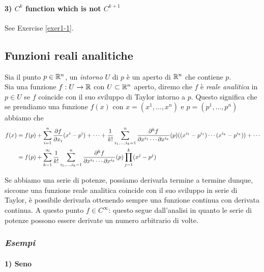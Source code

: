 \paragraph{3) $ C^{k} $ function which is not $ C^{k+1} $}

See Exercise \ref{exer1-1}.

\subsection{Funzioni reali analitiche}

Sia il punto $ p \in \mathbb{R}^{n} $, un \textit{intorno} $ U $ di $ p $ è un aperto di $ \mathbb{R}^{n} $ che contiene $ p $. \\
Sia una funzione $ f : U \to \mathbb{R} $ con $ U \subset \mathbb{R}^{n} $ aperto, diremo che $ f $ è \textit{reale analitica} in $ p \in U $ se $ f $ coincide con il suo sviluppo di Taylor intorno a $ p $. Questo significa che se prendiamo una funzione $ f (x) $ con $ x = (x^{1}, \dots, x^{n}) $ e $ p = (p^{1}, \dots, p^{n}) $ abbiamo che
\begin{align}
	\begin{split}
		f (x) &= f (p) + \sum_{i=1}^{n} \pdv{f}{x_{i}} (p) (x^{i} - p^{i}) + \cdots + \dfrac{1}{k!} \sum_{i_{1},\dots,i_{k}=1}^{n} \dfrac{\partial^{k} f}{\partial x^{i_{1}} \cdots \partial x^{i_{k}}} (p) ( (x^{i_{1}} - p^{i_{1}}) \cdots (x^{i_{k}} - p^{i_{k}}) ) + \cdots \\
		&= f (p) + \sum_{k=1}^{\infty} \dfrac{1}{k!} \sum_{i_{1},\dots,i_{k}=1}^{n} \dfrac{\partial^{k} f}{\partial x^{i_{1}} \cdots \partial x^{i_{k}}} (p) \prod_{j=1}^{k} (x^{j} - p^{j})
	\end{split}
\end{align}

Se abbiamo una serie di potenze, possiamo derivarla termine a termine dunque, siccome una funzione reale analitica coincide con il suo sviluppo in serie di Taylor, è possibile derivarla ottenendo sempre una funzione continua con derivata continua. A questo punto $ f \in C^{\infty} $: questo segue dall'analisi in quanto le serie di potenze possono essere derivate un numero arbitrario di volte.

\subsubsection{\textit{Esempi}}

\paragraph{1) Seno}

